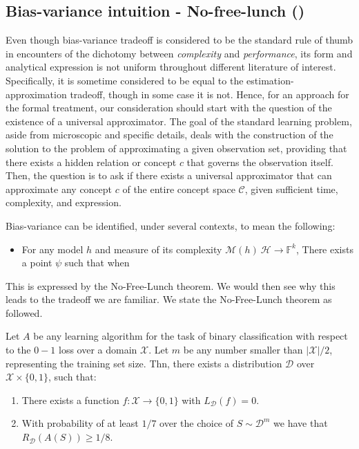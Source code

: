 \documentclass{article}
\begin{document}
\subsection{Bias-variance intuition - No-free-lunch (\cite{10.5555/2371238})}

Even though bias-variance tradeoff is considered to be the standard rule of thumb in encounters of the dichotomy between \textit{complexity} and \textit{performance}, its form and analytical expression is not uniform throughout different literature of interest. Specifically, it is sometime considered to be equal to the estimation-approximation tradeoff, though in some case it is not. Hence, for an approach for the formal treatment, our consideration should start with the question of the existence of a universal approximator. The goal of the standard learning problem, aside from microscopic and specific details, deals with the construction of the solution to the problem of approximating a given observation set, providing that there exists a hidden relation or concept $c$ that governs the observation itself. Then, the question is to ask if there exists a universal approximator that can approximate any concept $c$ of the entire concept space $\mathcal{C}$, given sufficient time, complexity, and expression. 

\begin{conjecture}
    Bias-variance can be identified, under several contexts, to mean the following: \begin{itemize}
        \item For any model $h$ and measure of its complexity $\mathcal{M}(h)\:\mathcal{H}\to \mathbb{F}^{k}$, There exists a point $\psi$ such that when
    \end{itemize}
\end{conjecture}

This is expressed by the No-Free-Lunch theorem. We would then see why this leads to the tradeoff we are familiar. We state the No-Free-Lunch theorem as followed.

\begin{theorem}
    Let $A$ be any learning algorithm for the task of binary classification with respect to the $0-1$ loss over a domain $\mathcal{X}$. Let $m$ be any number smaller than $|\mathcal{X}|/2$, representing the training set size. Thn, there exists a distribution $\mathcal{D}$ over $\mathcal{X}\times \{0,1\}$, such that: 
    \begin{enumerate}
        \item There exists a function $f:\mathcal{X}\to \{0,1\}$ with $L_{\mathcal{D}}(f)= 0$. 
        \item With probability of at least $1/7$ over the choice of $S\sim \mathcal{D}^{m}$ we have that $R_{\mathcal{D}}(A(S))\geq 1/8$. 
    \end{enumerate}
\end{theorem}
\end{document}
